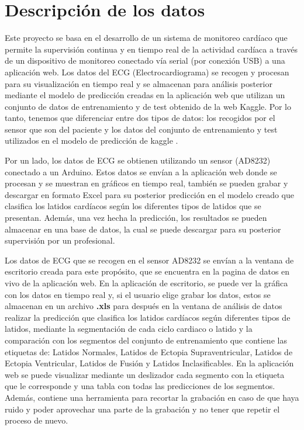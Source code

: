 
\section{Descripción de los datos}
Este proyecto se basa en el desarrollo de un sistema de monitoreo cardíaco que permite la supervisión continua y en tiempo real de la actividad cardíaca a través de un dispositivo de monitoreo conectado vía serial (por conexión USB) a una aplicación web. Los datos del ECG (Electrocardiograma) se recogen y procesan para su visualización en tiempo real y se almacenan para análisis posterior mediante el modelo de predicción creadas en la aplicación web que utilizan un conjunto de datos de entrenamiento y de test obtenido de la web Kaggle. Por lo tanto, tenemos que diferenciar entre dos tipos de datos: los recogidos por el sensor que son del paciente y los datos del conjunto de entrenamiento y test utilizados en el modelo de predicción de kaggle \cite{kaggle-data}.

Por un lado, los datos de ECG se obtienen utilizando un sensor (AD8232) conectado a un Arduino. Estos datos se envían a la aplicación web donde se procesan y se muestran en gráficos en tiempo real, también se pueden grabar y descargar en formato Excel para su posterior predicción en el modelo creado que clasifica los latidos cardíacos según los diferentes tipos de latidos que se presentan. Además, una vez hecha la predicción, los resultados se pueden almacenar en una base de datos, la cual se puede descargar para su posterior supervisión por un profesional.

Los datos de ECG que se recogen en el sensor AD8232 se envían a la ventana de escritorio creada para este propósito, que se encuentra en la pagina de datos en vivo de la aplicación web. En la aplicación de escritorio, se puede ver la gráfica con los datos en tiempo real y, si el usuario elige grabar los datos, estos se almacenan en un archivo \textbf{.xls} para después en la ventana de análisis de datos realizar la predicción que clasifica los latidos cardíacos según diferentes tipos de latidos, mediante la segmentación de cada ciclo cardiaco o latido y la comparación con los segmentos del conjunto de entrenamiento que contiene las etiquetas de: Latidos Normales, Latidos de Ectopia Supraventricular, Latidos de Ectopia Ventricular, Latidos de Fusión y Latidos Inclasificables. En la aplicación web se puede visualizar mediante un deslizador cada segmento con la etiqueta que le corresponde y una tabla con todas las predicciones de los segmentos. Además, contiene una herramienta para recortar la grabación en caso de que haya ruido y poder aprovechar una parte de la grabación y no tener que repetir el proceso de nuevo.

